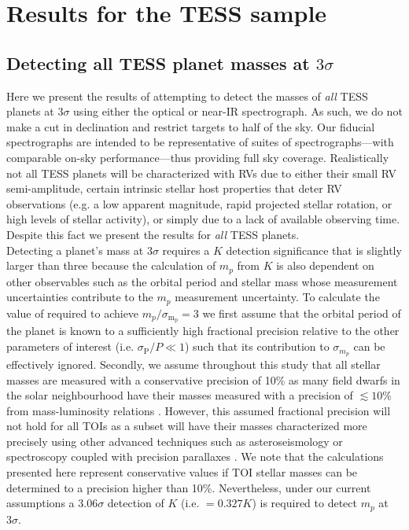 \section{Results for the TESS sample} \label{RVFCsect:results}
\subsection{Detecting all TESS planet masses at $3\sigma$} \label{RVFCsect:all}
Here we present the results of attempting to detect the masses of \emph{all} TESS planets at $3\sigma$
using either the optical or near-IR spectrograph. As such, we do not make a cut in declination and restrict
targets to half of the sky. Our fiducial spectrographs are intended to be representative of suites of
spectrographs---with comparable on-sky performance---thus providing full sky coverage. 
Realistically not all TESS planets will
be characterized with RVs due to either their small RV semi-amplitude, certain intrinsic stellar
host properties that deter RV observations (e.g. a low apparent
magnitude, rapid projected stellar rotation, or high levels of stellar activity), or simply due to
a lack of available observing time. Despite this fact we present the results for \emph{all} TESS
planets. \\

Detecting a planet's mass at $3\sigma$ requires a $K$ detection significance that is slightly larger
than three because the calculation of $m_p$ from $K$ is also dependent on other observables such as the
orbital period and stellar mass whose measurement uncertainties contribute to the $m_p$ measurement uncertainty.
To calculate the value of \sigK{}
required to achieve $m_p / \sigma_{\text{m}_\text{p}}=3$ we first assume that the orbital period
of the planet is known to a sufficiently high fractional precision relative to the other parameters
of interest (i.e. $\sigma_{\text{P}}/P \ll 1$) such that its contribution to $\sigma_{m_p}$
can be effectively ignored. Secondly, we assume throughout this study
that all stellar masses are measured with a conservative 
precision of 10\% as many field dwarfs in the solar neighbourhood have their masses measured
with a precision of $\lesssim 10$\% from mass-luminosity relations \citep{delfosse00, torres10}.
However, this assumed fractional precision will not hold for all TOIs as a
subset will have their masses characterized more precisely using other advanced techniques such as
asteroseismology or spectroscopy coupled with precision parallaxes \citep[e.g.][]{vaneylen18,fulton18}.
We note that the calculations presented here represent conservative
values if TOI stellar masses can be determined to a precision higher than 10\%. 
Nevertheless, under our current assumptions a $3.06\sigma$ detection of $K$
(i.e. \sigK{} $=0.327 K$) is required to detect $m_p$ at $3\sigma$. \\

